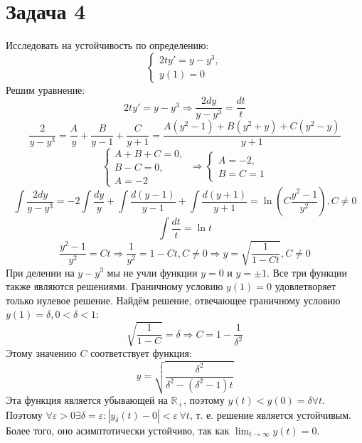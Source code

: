 \documentclass[11pt]{article}
\begin{document}
\section{Задача 4}
\label{sec:org4eb04cd}
Исследовать на устойчивость по определению:
\begin{equation*}
\begin{cases}
2ty' = y - y^3, \\
y(1) = 0
\end{cases}
\end{equation*}
Решим уравнение:
$$2ty' = y - y^3 \Rightarrow \frac{2dy}{y - y^3} = \frac{dt}t$$
$$\frac{2}{y - y^3} = \frac{A}{y} + \frac{B}{y - 1} + \frac{C}{y + 1} =
\frac{A(y^2 - 1) + B(y^2 + y) + C(y^2 - y)}{y + 1}$$
\begin{equation*}
\begin{cases}
A + B + C = 0, \\
B - C = 0, \\
A = -2
\end{cases}\
\Rightarrow
\begin{cases}
A = -2, \\
B = C = 1
\end{cases}
\end{equation*}
$$\int\frac{2dy}{y - y^3} = -2\int\frac{dy}y + \int\frac{d(y - 1)}{y - 1} +
\int\frac{d(y + 1)}{y + 1} = \ln\left(C\frac{y^2 - 1}{y^2}\right), C \neq 0$$
$$\int\frac{dt}t = \ln t$$
$$\frac{y^2 - 1}{y^2} = Ct \Rightarrow \frac{1}{y^2} = 1 - Ct, C \neq 0 \Rightarrow
y = \sqrt{\frac{1}{1 - Ct}}, C \neq 0$$
При делении на \(y - y^3\) мы не учли функции \(y = 0\) и \(y = \pm 1\). Все три функции также
являются решениями.
Граничному условию \(y(1) = 0\) удовлетворяет только нулевое решение. Найдём решение, отвечающее
граничному условию \(y(1) = \delta, 0 < \delta < 1\):
$$\sqrt{\frac{1}{1 - C}} = \delta \Rightarrow C = 1 - \frac{1}{\delta^2}$$
Этому значению \(C\) соответствует функция:
$$y = \sqrt{\frac{\delta^2}{\delta^2 - (\delta^2 - 1)t}}$$
Эта функция является убывающей на \(\mathbb{R}_+\), поэтому \(y(t) < y(0) = \delta \forall t\).
Поэтому \(\forall \varepsilon > 0 \exists \delta = \varepsilon: |y_{\delta}(t) - 0| < \varepsilon\, \forall t\),
т. е. решение является устойчивым. Более того, оно асимптотически устойчиво, так как \(\lim_{t \to \infty}y(t) = 0\).
\end{document}
